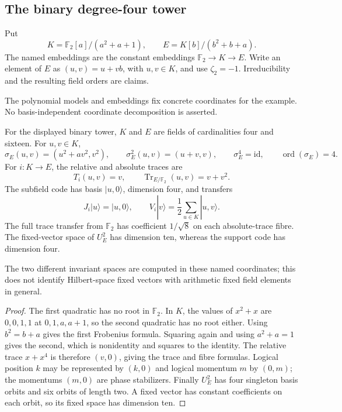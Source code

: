 \subsection{The binary degree-four tower}

\begin{definition}
Put
\[
 K=\mathbb F_2[a]/(a^2+a+1),\qquad
 E=K[b]/(b^2+b+a).
\]
The named embeddings are the constant embeddings
$\mathbb F_2\to K\to E$.  Write an element of $E$ as
$(u,v)=u+vb$, with $u,v\in K$, and use $\zeta_2=-1$.
Irreducibility and the resulting field orders are claims.
\end{definition}
\begin{scope}
The polynomial models and embeddings fix concrete coordinates for the
example.  No basis-independent coordinate decomposition is asserted.
\end{scope}

\begin{theorem}
{\normalfont\statusProved}\quad
For the displayed binary tower, $K$ and $E$ are fields of cardinalities
four and sixteen.  For $u,v\in K$,
\[
 \sigma_E(u,v)=(u^2+av^2,v^2),\qquad
 \sigma_E^2(u,v)=(u+v,v),\qquad
 \sigma_E^4=\mathrm{id},\qquad \operatorname{ord}(\sigma_E)=4.
\]
For $i:K\to E$, the relative and absolute traces are
\[
 T_i(u,v)=v,\qquad
 \operatorname{Tr}_{E/\mathbb F_2}(u,v)=v+v^2.
\]
The subfield code has basis $|u,0\rangle$, dimension four, and transfers
\[
 J_i|u\rangle=|u,0\rangle,\qquad
 V_i|v\rangle=\frac12\sum_{u\in K}|u,v\rangle.
\]
The full trace transfer from $\mathbb F_2$ has coefficient $1/\sqrt8$
on each absolute-trace fibre.  The fixed-vector space of $U_E^2$ has
dimension ten, whereas the support code has dimension four.
\end{theorem}
\begin{scope}
The two different invariant spaces are computed in these named
coordinates; this does not identify Hilbert-space fixed vectors with
arithmetic fixed field elements in general.
\end{scope}
\begin{proof}
The first quadratic has no root in $\mathbb F_2$.
In $K$, the values of $x^2+x$ are $0,0,1,1$ at
$0,1,a,a+1$, so the second quadratic has no root either.
Using $b^2=b+a$ gives the first Frobenius formula.  Squaring again
and using $a^2+a=1$ gives the second, which is nonidentity and squares
to the identity.  The relative trace $x+x^4$ is therefore $(v,0)$,
giving the trace and fibre formulas.  Logical position $k$ may be
represented by $(k,0)$ and logical momentum $m$ by $(0,m)$; the
momentums $(m,0)$ are phase stabilizers.  Finally $U_E^2$ has four
singleton basis orbits and six orbits of length two.  A fixed vector
has constant coefficients on each orbit, so its fixed space has
dimension ten.
\end{proof}

